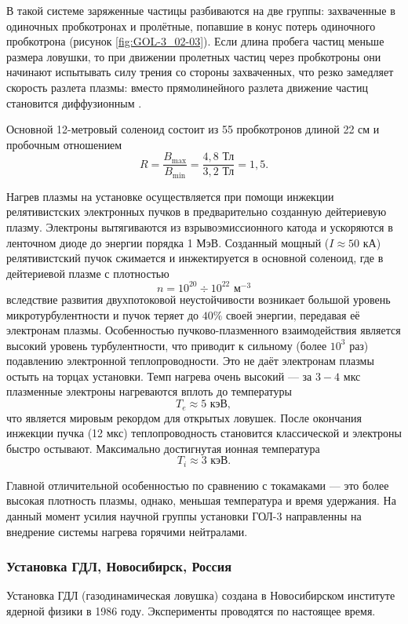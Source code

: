 В такой системе заряженные частицы разбиваются на две группы: захваченные в одиночных пробкотронах и пролётные, попавшие в конус потерь одиночного пробкотрона (рисунок \ref{fig:GOL-3_02-03}). Если длина пробега частиц меньше размера ловушки, то при движении пролетных частиц через пробкотроны они начинают испытывать силу трения со стороны захваченных, что резко замедляет скорость разлета плазмы: вместо прямолинейного разлета движение частиц становится диффузионным \cite{gol3_review}.


Основной 12-метровый соленоид состоит из 55 пробкотронов длиной 22 см и пробочным отношением
\[
R = \frac{B_{\max}}{B_{\min}} = \frac{4,8 \text{ Тл}}{3,2 \text{ Тл}} = 1,5.
\]

Нагрев плазмы на установке осуществляется при помощи инжекции релятивистских электронных пучков в предварительно созданную дейтериевую плазму. Электроны   вытягиваются из взрывоэмиссионного катода и ускоряются в ленточном диоде до энергии порядка 1 МэВ. Созданный мощный ($I \approx 50$ кА) релятивистский пучок сжимается и инжектируется в основной соленоид, где в дейтериевой плазме с плотностью 
\[
n = 10^{20} \div 10^{22} \text{ м}^{-3}
\]
вследствие развития двухпотоковой неустойчивости возникает большой уровень микротурбулентности и пучок теряет до $40\%$ своей энергии, передавая её электронам плазмы. Особенностью пучково-плазменного взаимодействия является высокий уровень турбулентности, что приводит к сильному (более $10^3$ раз) подавлению электронной теплопроводности. Это не даёт электронам плазмы остыть на торцах установки. Темп нагрева очень высокий --- за $3 - 4$ мкс плазменные электроны нагреваются вплоть до температуры 
\[
T_e \approx 5 \text{ кэВ},
\]
что является мировым рекордом для открытых ловушек. После окончания инжекции пучка (12 мкс) теплопроводность становится классической и электроны быстро остывают. Максимально достигнутая ионная температура \cite{gol3_prog}
\[
T_i \approx 3 \text{ кэВ}.
\]


Главной отличительной особенностью по сравнению с токамаками --- это более высокая плотность плазмы, однако, меньшая температура и время удержания. На данный момент усилия научной группы установки ГОЛ-3 направленны на внедрение системы нагрева горячими нейтралами.


\subsubsection{Установка ГДЛ, Новосибирск, Россия}


Установка ГДЛ (газодинамическая ловушка) создана в Новосибирском институте ядерной физики в 1986 году.  Эксперименты проводятся по настоящее время.


